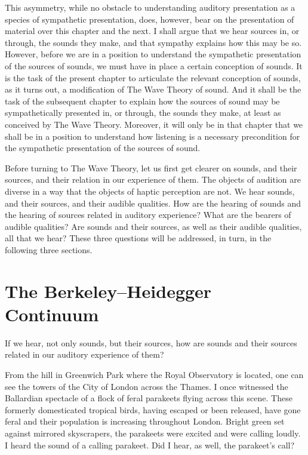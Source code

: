 This asymmetry, while no obstacle to understanding auditory presentation as a species of sympathetic presentation, does, however, bear on the presentation of material over this chapter and the next. I shall argue that we hear sources in, or through, the sounds they make, and that sympathy explains how this may be so. However, before we are in a position to understand the sympathetic presentation of the sources of sounds, we must have in place a certain conception of sounds. It is the task of the present chapter to articulate the relevant conception of sounds, as it turns out, a modification of The Wave Theory of sound. And it shall be the task of the subsequent chapter to explain how the sources of sound may be sympathetically presented in, or through, the sounds they make, at least as conceived by The Wave Theory. Moreover, it will only be in that chapter that we shall be in a position to understand how listening is a necessary precondition for the sympathetic presentation of the sources of sound.

Before turning to The Wave Theory, let us first get clearer on sounds, and their sources, and their relation in our experience of them. The objects of audition are diverse in a way that the objects of haptic perception are not. We hear sounds, and their sources, and their audible qualities. How are the hearing of sounds and the hearing of sources related in auditory experience? What are the bearers of audible qualities? Are sounds and their sources, as well as their audible qualities, all that we hear? These three questions will be addressed, in turn, in the following three sections.


\section{The Berkeley--Heidegger Continuum} %
\label{sec:the_berkeley_heidegger_continuum}

If we hear, not only sounds, but their sources, how are sounds and their sources related in our auditory experience of them?

From the hill in Greenwich Park where the Royal Observatory is located, one can see the towers of the City of London across the Thames. I once witnessed the Ballardian spectacle of a flock of feral parakeets flying across this scene. These formerly domesticated tropical birds, having escaped or been released, have gone feral and their population is increasing throughout London. Bright green set against mirrored skyscrapers, the parakeets were excited and were calling loudly. I heard the sound of a calling parakeet. Did I hear, as well, the parakeet's call?

